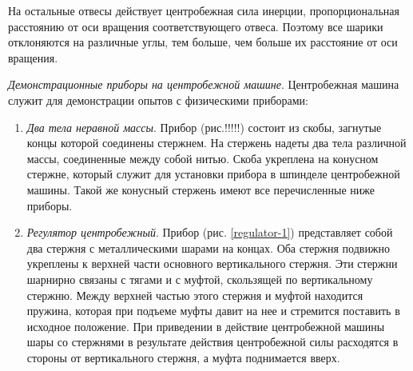 \documentclass[All.tex]{subfiles}
\begin{document}
На остальные отвесы действует центробежная сила инерции, пропорциональная расстоянию от оси вращения соответствующего отвеса.
Поэтому все шарики отклоняются на различные углы, тем больше, чем больше их расстояние от оси вращения.

\textit{Демонстрационные приборы на центробежной машине}. 
Центробежная машина служит для демонстрации опытов с физическими приборами:
\begin{enumerate} 
	\item \textit{Два тела неравной массы}. Прибор (рис.!!!!!) состоит из скобы, загнутые концы которой соединены стержнем. На стержень надеты два тела различной массы, соединенные между собой нитью. Скоба укреплена на конусном стержне, который служит для установки прибора в шпинделе центробежной машины. Такой же конусный стержень имеют все перечисленные ниже приборы.
	\item \textit{Регулятор центробежный}. Прибор (рис. \ref{regulator-1}) представляет собой два стержня с металлическими шарами на концах.
	Оба стержня подвижно укреплены к верхней части основного вертикального стержня. Эти стержни шарнирно связаны с тягами и с муфтой, скользящей по вертикальному стержню. Между верхней частью этого стержня и муфтой находится пружина, которая при подъеме муфты давит на нее и стремится поставить в исходное положение.
	При приведении в действие центробежной машины шары со стержнями в результате действия центробежной силы расходятся в стороны от вертикального стержня, а муфта поднимается вверх.
	\end{enumerate}
\end{document}
